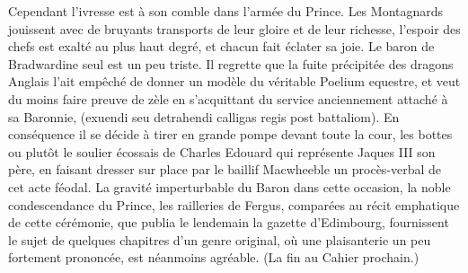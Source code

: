 Cependant l'ivresse est à son comble dans l'armée du Prince. Les Montagnards jouissent avec de bruyants transports de leur gloire et de leur richesse, l'espoir des chefs est exalté au plus haut degré, et chacun fait éclater sa joie. Le baron de Bradwardine seul est un peu triste. Il regrette que la fuite précipitée des dragons Anglais l'ait empêché de donner un modèle du véritable Poelium equestre, et veut du moins faire preuve de zèle en s'acquittant du service anciennement attaché à sa Baronnie, (exuendi seu detrahendi calligas regis post battaliom). En conséquence il se décide à tirer en grande pompe devant toute\setcounter{page}{248} la cour, les bottes ou plutôt le soulier écossais de Charles Edouard qui représente Jaques III son père, en faisant dresser sur place par le baillif Macwheeble un procès-verbal de cet acte féodal. La gravité imperturbable du Baron dans cette occasion, la noble condescendance du Prince, les railleries de Fergus, comparées au récit emphatique de cette cérémonie, que publia le lendemain la gazette d'Edimbourg, fournissent le sujet de quelques chapitres d'un genre original, où une plaisanterie un peu fortement prononcée, est néanmoins agréable.
(La fin au Cahier prochain.)